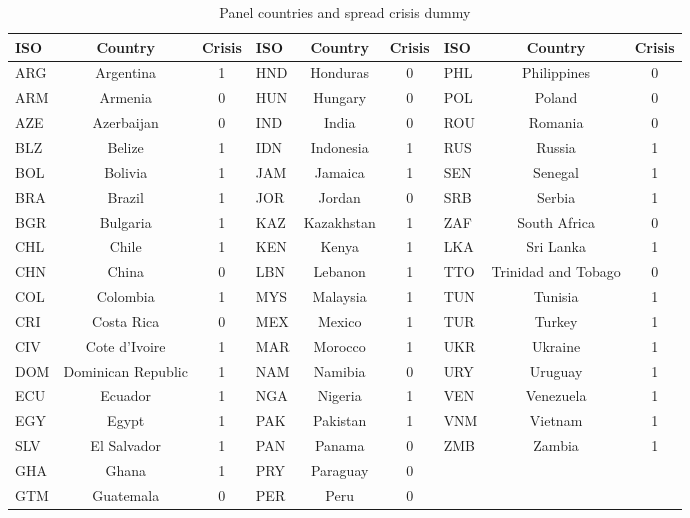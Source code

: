 \documentclass[12pt]{article}
\begin{document}
\begin{table}[th]
\centering
\caption{Panel countries and spread crisis dummy}
\label{tab:A1}
\footnotesize
\begin{tabular}{lcc@{\hspace{18pt}}lcc@{\hspace{18pt}}lcc}
\toprule
ISO & Country & Crisis & ISO & Country & Crisis & ISO & Country & Crisis \\
\midrule
ARG & Argentina & 1 & HND & Honduras & 0 & PHL & Philippines & 0 \\
ARM & Armenia & 0 & HUN & Hungary & 0 & POL & Poland & 0 \\
AZE & Azerbaijan & 0 & IND & India & 0 & ROU & Romania & 0 \\
BLZ & Belize & 1 & IDN & Indonesia & 1 & RUS & Russia & 1 \\
BOL & Bolivia & 1 & JAM & Jamaica & 1 & SEN & Senegal & 1 \\
BRA & Brazil & 1 & JOR & Jordan & 0 & SRB & Serbia & 1 \\
BGR & Bulgaria & 1 & KAZ & Kazakhstan & 1 & ZAF & South Africa & 0 \\
CHL & Chile & 1 & KEN & Kenya & 1 & LKA & Sri Lanka & 1 \\
CHN & China & 0 & LBN & Lebanon & 1 & TTO & Trinidad and Tobago & 0 \\
COL & Colombia & 1 & MYS & Malaysia & 1 & TUN & Tunisia & 1 \\
CRI & Costa Rica & 0 & MEX & Mexico & 1 & TUR & Turkey & 1 \\
CIV & Cote d'Ivoire & 1 & MAR & Morocco & 1 & UKR & Ukraine & 1 \\
DOM & Dominican Republic & 1 & NAM & Namibia & 0 & URY & Uruguay & 1 \\
ECU & Ecuador & 1 & NGA & Nigeria & 1 & VEN & Venezuela & 1 \\
EGY & Egypt & 1 & PAK & Pakistan & 1 & VNM & Vietnam & 1 \\
SLV & El Salvador & 1 & PAN & Panama & 0 & ZMB & Zambia & 1 \\
GHA & Ghana & 1 & PRY & Paraguay & 0 & & & \\
GTM & Guatemala & 0 & PER & Peru & 0 & & & \\
\bottomrule
\end{tabular}
\end{table}
\end{document}
